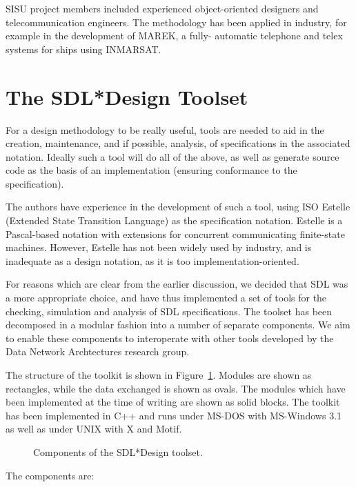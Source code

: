 SISU project members included experienced object-oriented designers
and telecommunication engineers. The methodology has been applied
in industry, for example in the development of MAREK, a fully-
automatic telephone and telex systems for ships using INMARSAT.

\section{The SDL*Design Toolset}

For a design methodology to be really useful, tools are needed to
aid in the creation, maintenance, and if possible, analysis, of
specifications in the associated notation. Ideally such a tool
will do all of the above, as well as generate source code as the
basis of an implementation (ensuring conformance to the specification).

The authors have experience in the development of such a tool, using ISO
Estelle (Extended State Transition Language) as the specification 
notation. Estelle is a Pascal-based notation with extensions for
concurrent communicating finite-state machines. However, Estelle has
not been widely used by industry, and is inadequate as a design notation,
as it is too implementation-oriented.

For reasons which are clear from the earlier discussion, we
decided that SDL was a more appropriate choice, and have thus
implemented a set of tools for the checking, simulation and analysis
of SDL specifications. The toolset has been decomposed in a modular
fashion into a number of separate components.
We  aim to enable these components to interoperate with
other tools developed by the Data Network Archtectures 
research group.
 
The structure of the toolkit is shown in Figure~\ref{sdltool}. 
Modules are shown as rectangles, while the data exchanged is shown as
ovals. The modules which have been implemented at the time of
writing are shown as solid blocks. The toolkit has been implemented
in C++ and runs under MS-DOS with MS-Windows 3.1 as well
as under UNIX with X and Motif.

\begin{figure}\centering
\epsfxsize=15cm
\caption{\label{sdltool} Components of the SDL*Design toolset.}
\end{figure}

The components are:

